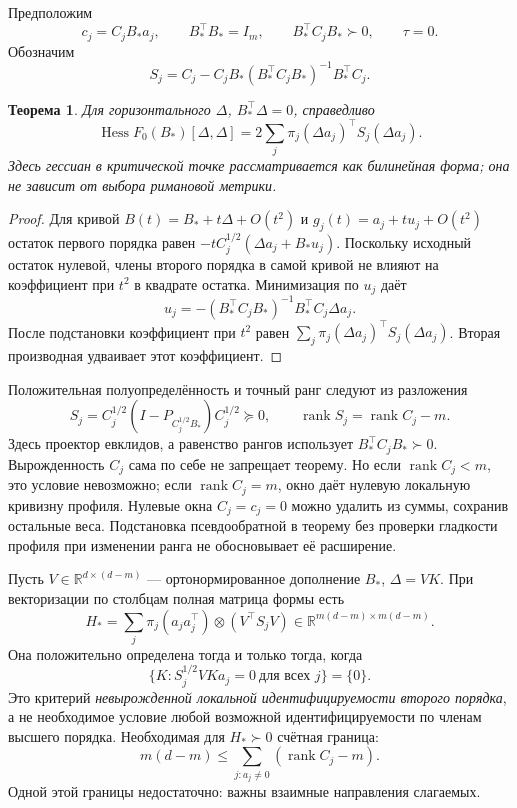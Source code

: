 \documentclass[11pt,a4paper]{article}
\newcommand{\R}{\mathbb R}
\newcommand{\rank}{\operatorname{rank}}
\newcommand{\Hess}{\operatorname{Hess}}
\newtheorem{theorem}{Теорема}[section]
\theoremstyle{remark}
\begin{document}
Предположим
\begin{equation}\label{eq:ideal}
 c_j=C_jB_*a_j,\qquad B_*^\top B_*=I_m,\qquad
 B_*^\top C_jB_*\succ0,\qquad \tau=0.
\end{equation}
Обозначим
\[
 S_j=C_j-C_jB_*(B_*^\top C_jB_*)^{-1}B_*^\top C_j.
\]
\begin{theorem}\label{th:ideal}
Для горизонтального $\Delta$, $B_*^\top\Delta=0$, справедливо
\begin{equation}\label{eq:ideal-hessian}
 \Hess F_0(B_*)[\Delta,\Delta]
 =2\sum_j\pi_j(\Delta a_j)^\top S_j(\Delta a_j).
\end{equation}
Здесь гессиан в критической точке рассматривается как билинейная форма;
она не зависит от выбора римановой метрики.
\end{theorem}
\begin{proof}
Для кривой $B(t)=B_*+t\Delta+O(t^2)$ и
$g_j(t)=a_j+tu_j+O(t^2)$ остаток первого порядка равен
$-tC_j^{1/2}(\Delta a_j+B_*u_j)$. Поскольку исходный остаток нулевой,
члены второго порядка в самой кривой не влияют на коэффициент при $t^2$
в квадрате остатка. Минимизация по $u_j$ даёт
\[
 u_j=-(B_*^\top C_jB_*)^{-1}B_*^\top C_j\Delta a_j.
\]
После подстановки коэффициент при $t^2$ равен
$\sum_j\pi_j(\Delta a_j)^\top S_j(\Delta a_j)$.
Вторая производная удваивает этот коэффициент.
\end{proof}

Положительная полуопределённость и точный ранг следуют из разложения
\begin{equation}\label{eq:schur-factor}
 S_j=C_j^{1/2}(I-P_{C_j^{1/2}B_*})C_j^{1/2}\succeq0,
 \qquad \rank S_j=\rank C_j-m.
\end{equation}
Здесь проектор евклидов, а равенство рангов использует
$B_*^\top C_jB_*\succ0$. Вырожденность $C_j$ сама по себе не запрещает
теорему. Но если $\rank C_j<m$, это условие невозможно; если
$\rank C_j=m$, окно даёт нулевую локальную кривизну профиля.
Нулевые окна $C_j=c_j=0$ можно удалить из суммы, сохранив остальные веса.
Подстановка псевдообратной в теорему без проверки гладкости профиля при
изменении ранга не обосновывает её расширение.

Пусть $V\in\R^{d\times(d-m)}$ --- ортонормированное дополнение $B_*$,
$\Delta=VK$. При векторизации по столбцам полная матрица формы есть
\begin{equation}\label{eq:tangent-matrix}
 H_* =\sum_j\pi_j(a_ja_j^\top)\otimes(V^\top S_jV)
 \in\R^{m(d-m)\times m(d-m)}.
\end{equation}
Она положительно определена тогда и только тогда, когда
\begin{equation}\label{eq:identification}
 \{K:S_j^{1/2}VK a_j=0\ \text{для всех }j\}=\{0\}.
\end{equation}
Это критерий \emph{невырожденной локальной идентифицируемости второго
порядка}, а не необходимое условие любой возможной идентифицируемости
по членам высшего порядка. Необходимая для $H_*\succ0$ счётная граница:
\[
 m(d-m)\le\sum_{j:a_j\ne0}(\rank C_j-m).
\]
Одной этой границы недостаточно: важны взаимные направления слагаемых.
\end{document}
